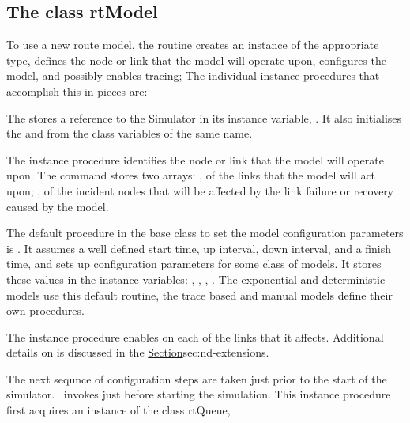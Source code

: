 \subsection{The class rtModel}
\label{sec:rtmodel}

To use a new route model, the routine 
creates an instance of the appropriate type,
defines the node or link that the model will operate upon,
configures the model,
and possibly enables tracing;
The individual instance procedures that accomplish this in pieces are:
\begin{list}{}{}
\item The 
  stores a reference to the Simulator in its instance variable, .
  It also initialises the  and 
  from the class variables of the same name.
\item The instance procedure 
  identifies the node or link that the model will operate upon.
  The command stores two arrays: , of the links that the
  model will act upon; , of the incident nodes
  that will be affected by the link failure or recovery caused by the model.
\item The default procedure in the base class
   to set the model configuration parameters is
  .
  It assumes a well defined
  start time, up interval, down interval, and a finish time,
  and sets up configuration parameters for some class of models.
  It stores these values in the instance variables:
  , , ,
  .
    The exponential and deterministic models use this default routine,
  the trace based and manual models define their own procedures.
\item %
  The instance procedure
  enables  on each of the links that it affects.
  Additional details on  is discussed in the
  \href{section on extensions to the class Link}{Section}{sec:nd-extensions}.
\end{list}
The next sequnce of configuration steps are taken just prior to
the start of the simulator.
\ns\ invokes 
just before starting the simulation.
This instance procedure first acquires an instance of the class rtQueue,
